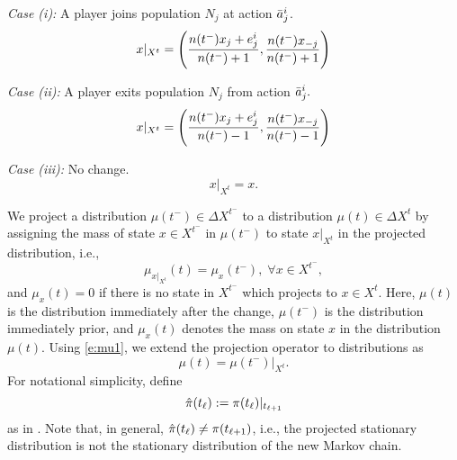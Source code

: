 \noindent\emph{Case (i):} A player joins population $N_j$ at action $\bar{a}_j^i$. 
\begin{equation}
x|_{X^t} = \left(\frac{n(t^-)x_{j} + e_j^i}{n(t^-) +1}, \frac{n(t^-)x_{-j}}{n(t^-) +1}\right)
\end{equation}

\noindent\emph{Case (ii):} A player exits population $N_j$ from action $\bar{a}_j^i.$
\begin{equation}
x|_{X^t} = \left(\frac{n(t^-)x_{j} + e_j^i}{n(t^-) -1}, \frac{n(t^-)x_{-j}}{n(t^-) -1}\right)
\end{equation}

\noindent\emph{Case (iii):} No change.
\begin{equation}
x|_{X^t} = x.
\end{equation}

We project a distribution $\mu(t^-)\in \Delta X^{t^-}$  to a distribution $\mu(t)\in\Delta X^t$ by assigning the mass of state $x\in X^{t^-}$  in $\mu(t^-)$ to state $x|_{X^t}$ in the projected distribution, i.e., 
\begin{equation}\label{e:mu1}
\mu_{x|_{X^t}}(t) = \mu_x(t^-),\; \forall x\in X^{t^-},
\end{equation}
and $\mu_x(t) =0$ if there is no state in $X^{t^-}$ which projects to $x\in X^t.$ Here, $\mu(t)$ is the distribution immediately after the change, $\mu(t^-)$ is the distribution immediately prior, and $\mu_x(t)$ denotes the mass on state $x$ in the distribution $\mu(t).$ Using \eqref{e:mu1}, we extend the projection operator to distributions as
\begin{equation}
\mu(t) = \mu(t^-)|_{X^t}.
\end{equation}
 For notational simplicity, define
\begin{equation}
\hat{\pi}(t_{{\ell}}):=\pi(t_{{\ell}})|_{t_{{\ell}+1}}
\end{equation}
as in \cite{Shah2010}. %
Note that, in general, $\hat{\pi}(t_{{\ell}})\neq \pi(t_{{\ell}+1})$, i.e., the projected stationary distribution is not the stationary distribution of the new Markov chain.

